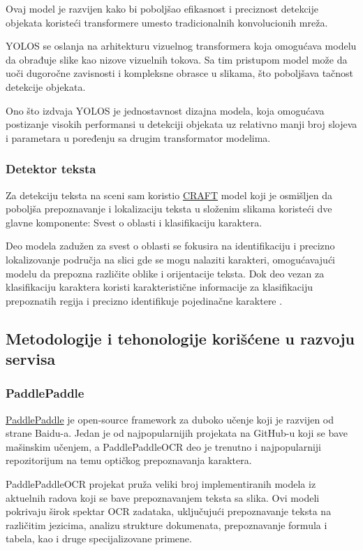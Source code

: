 \documentclass[a4paper,12pt]{article}
\begin{document}
	Ovaj model je razvijen kako bi poboljšao efikasnost i preciznost detekcije objekata koristeći transformere umesto tradicionalnih konvolucionih mreža.
	
	YOLOS se oslanja na arhitekturu vizuelnog transformera koja omogućava modelu da obrađuje slike kao nizove vizuelnih tokova. Sa tim pristupom model može da uoči dugoročne zavisnosti i kompleksne obrasce u slikama, što poboljšava tačnost detekcije objekata.
	
	Ono što izdvaja YOLOS je jednostavnost dizajna modela, koja omogućava postizanje visokih performansi u detekciji objekata uz relativno manji broj slojeva i parametara u poređenju sa drugim transformator modelima.
	
	\subsubsection{Detektor teksta}
	Za detekciju teksta na sceni sam koristio \href{https://github.com/clovaai/CRAFT-pytorch?tab=readme-ov-file}{CRAFT} model koji je osmišljen da poboljša prepoznavanje i lokalizaciju teksta u složenim slikama koristeći dve glavne komponente: Svest o oblasti i klasifikaciju karaktera.
	
	Deo modela zadužen za svest o oblasti se fokusira na identifikaciju i precizno lokalizovanje područja na slici gde se mogu nalaziti karakteri, omogućavajući modelu da prepozna različite oblike i orijentacije teksta. Dok deo vezan za klasifikaciju karaktera koristi karakteristične informacije za klasifikaciju prepoznatih regija i precizno identifikuje pojedinačne karaktere \cite{baek2019characterregionawarenesstext}.
	
	\subsection{Metodologije i tehonologije korišćene u razvoju servisa}
	\subsubsection{PaddlePaddle}
	\href{https://github.com/PaddlePaddle}{PaddlePaddle} je open-source framework za duboko učenje koji je razvijen od strane Baidu-a. Jedan je od najpopularnijih projekata na GitHub-u koji se bave mašinskim učenjem, a PaddlePaddleOCR deo je trenutno i najpopularniji repozitorijum na temu optičkog prepoznavanja karaktera.
	
	PaddlePaddleOCR projekat pruža veliki broj implementiranih modela iz aktuelnih radova koji se bave prepoznavanjem teksta sa slika. Ovi modeli pokrivaju širok spektar OCR zadataka, uključujući prepoznavanje teksta na različitim jezicima, analizu strukture dokumenata, prepoznavanje formula i tabela, kao i druge specijalizovane primene.
	
\end{document}
